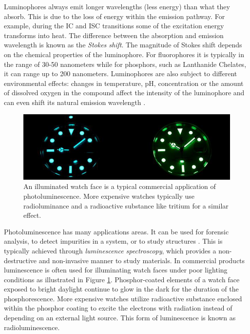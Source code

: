 \documentclass[thesis.tex]{subfiles}
\begin{document}
Luminophores always emit longer wavelengths (less energy) than what they absorb. This is due to the loss of energy within the emission pathway. For example, during the IC and ISC transitions some of the excitation energy transforms into heat. The difference between the absorption and emission wavelength is known as the \emph{Stokes shift}. The magnitude of Stokes shift depends on the chemical properties of the luminophore. For fluorophores it is typically in the range of 30-50 nanometers while for phosphors, such as Lanthanide Chelates, it can range up to 200 nanometers. Luminophores are also subject to different environmental effects: changes in temperature, pH, concentration or the amount of dissolved oxygen in the compound affect the intensity of the luminophore and can even shift its natural emission wavelength \cite{hemmila}. \cite{luminescence_basics} 

\begin{figure}[ht]
\centering \includegraphics[width=\textwidth]{images/photoluminescence_example}
\caption{An illuminated watch face is a typical commercial application of photoluminescence. More expensive watches typically use radioluminance and a radioactive substance like tritium for a similar effect.\label{figure:photoluminescence_example}}
\end{figure}

Photoluminescence has many applications areas. It can be used for forensic analysis, to detect impurities in a system, or to study structures \cite{photoluminescence_use_case_2}\cite{photoluminescence_use_case_1}\cite{photoluminescence_use_case_3}. This is typically achieved through \emph{luminescence spectroscopy}, which provides a non-destructive and non-invasive manner to study materials. In commercial products luminescence is often used for illuminating watch faces under poor lighting conditions as illustrated in Figure \ref{figure:photoluminescence_example}. Phosphor-coated elements of a watch face exposed to bright daylight continue to glow in the dark for the duration of the phosphorescence. More expensive watches utilize radioactive substance enclosed within the phosphor coating to excite the electrons with radiation instead of depending on an external light source. This form of luminescence is known as radioluminescence.
\end{document}
